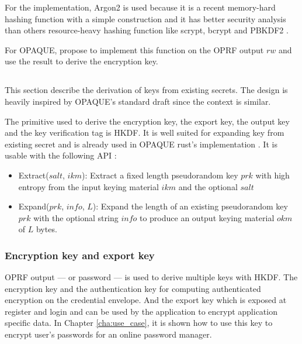 \documentclass[../report.tex]{subfiles}
\begin{document}
For the implementation, Argon2 is used because it is a recent memory-hard hashing function with a simple construction and it has better security analysis than others resource-heavy hashing function like scrypt, bcrypt and PBKDF2 \cite{CAA}.

For OPAQUE, \cite{OPAQUE_Standard_Draft} propose to implement this function on the OPRF output $rw$ and use the result to derive the encryption key.





\subsection{}

This section describe the derivation of keys from existing secrets. The design is heavily inspired by OPAQUE's standard draft \cite{OPAQUE_Standard_Draft} since the context is similar.


The primitive used to derive the encryption key, the export key, the output key and the key verification tag is HKDF. It is well suited for expanding key from existing secret and is already used in OPAQUE rust's implementation \cite{OPAQUE-KE}.
It is usable with the following API :

\begin{itemize}
 \item Extract($salt$, $ikm$): Extract a fixed length pseudorandom key $prk$ with high entropy from the input keying material $ikm$ and the optional $salt$
 \item Expand($prk$, $info$, $L$): Expand the length of an existing pseudorandom key $prk$ with the optional string $info$ to produce an output keying material $okm$ of $L$ bytes.
\end{itemize}


\subsubsection{Encryption key and export key}

OPRF output --- or password --- is used to derive multiple keys with HKDF. The encryption key and the authentication key for computing authenticated encryption on the credential envelope. And the export key which is exposed at register and login and can be used by the application to encrypt application specific data. In Chapter \ref{cha:use_case}, it is shown how to use this key to encrypt user's passwords for an online password manager.
\end{document}
